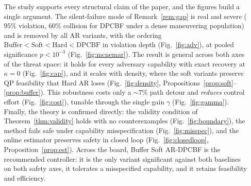 The study supports every structural claim of the paper, and the figures build
a single argument. The silent-failure mode of Remark~\ref{rem:gap} is real and
severe ($95\%$ violation, $60\%$ collision for DPCBF under a dense maneuvering
population) and is removed by all AR variants, with the ordering
$\text{Buffer}<\text{Soft}<\text{Hard}<\text{DPCBF}$ in violation depth
(Fig.~\ref{fig:adv}), at pooled significance $p<10^{-3}$
(Fig.~\ref{fig:mcnemar}). The result is general across both axes of the
threat space: it holds for every adversary capability with exact recovery at
$\kappa=0$ (Fig.~\ref{fig:cap}), and it scales with density, where the soft
variants preserve QP feasibility that Hard AR loses
(Fig.~\ref{fig:density}, Propositions~\ref{prop:soft}--\ref{prop:buffer}).
This robustness costs only a $\sim\!7\%$ path detour and \emph{reduces}
control effort (Fig.~\ref{fig:cost}), tunable through the single gain $\gamma$
(Fig.~\ref{fig:gamma}). Finally, the theory is confirmed directly: the
validity condition of Theorem~\ref{thm:validity} holds with no counterexamples
(Fig.~\ref{fig:boundary}), the method fails safe under capability
misspecification (Fig.~\ref{fig:misspec}), and the online estimator preserves
safety in closed loop (Fig.~\ref{fig:closedloop},
Proposition~\ref{prop:est}). Across the board, Buffer Soft AR-DPCBF is the
recommended controller: it is the only variant significant against both
baselines on both safety axes, it tolerates a misspecified capability, and it
retains feasibility and efficiency.

